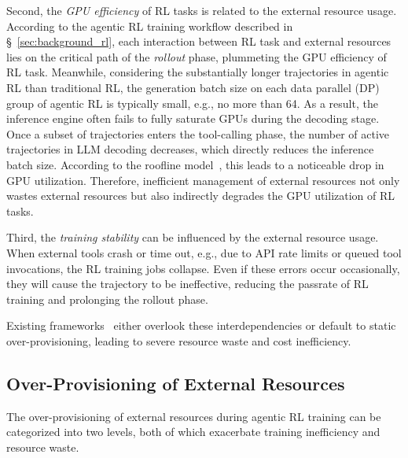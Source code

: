 Second, the \textit{GPU efficiency} of RL tasks is related to the external resource usage.
According to the agentic RL training workflow described in \S~\ref{sec:background_rl}, each interaction between RL task and external resources lies on the critical path of the \textit{rollout} phase, plummeting the GPU efficiency of RL task.
Meanwhile, considering the substantially longer trajectories in agentic RL than traditional RL, the generation batch size on each data parallel (DP) group of agentic RL  is typically small, e.g., no more than 64.
As a result, the inference engine often fails to fully saturate GPUs during the decoding stage.
Once a subset of trajectories enters the tool-calling phase, the number of active trajectories in LLM decoding decreases, which directly reduces the inference batch size. 
According to the roofline model~\citep{}, this leads to a noticeable drop in GPU utilization.
Therefore, inefficient management of external resources not only wastes external resources but also indirectly degrades the GPU utilization of RL tasks.

Third, the \textit{training stability} can be influenced by the external resource usage.
When external tools crash or time out, e.g., due to API rate limits or queued tool invocations, the RL training jobs collapse. Even if these errors occur occasionally, they will cause the trajectory to be ineffective, reducing the passrate of RL training and prolonging the rollout phase.
\fi

Existing frameworks~\citep{sheng2025hybridflow,fu2025areal,wang2025let} either overlook these interdependencies or default to static over-provisioning, leading to severe resource waste and cost inefficiency.

\subsection{Over-Provisioning of External Resources}
\label{sec:background_op}
The over-provisioning of external resources during agentic RL training can be categorized into two levels, both of which exacerbate training inefficiency and resource waste.

